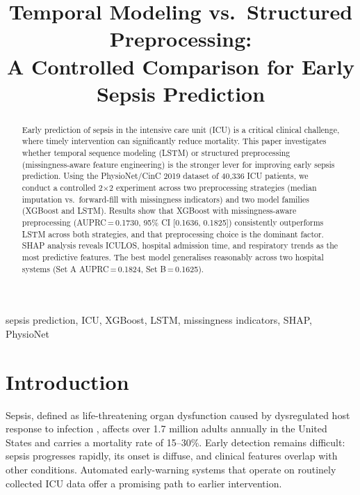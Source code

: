 \documentclass[conference]{IEEEtran}
\begin{document}
\title{Temporal Modeling vs.\ Structured Preprocessing:\\
A Controlled Comparison for Early Sepsis Prediction}

\author{
}

\maketitle

\begin{abstract}
Early prediction of sepsis in the intensive care unit (ICU) is a critical clinical
challenge, where timely intervention can significantly reduce mortality. This paper
investigates whether temporal sequence modeling (LSTM) or structured preprocessing
(missingness-aware feature engineering) is the stronger lever for improving early
sepsis prediction. Using the PhysioNet/CinC 2019 dataset of 40,336 ICU patients,
we conduct a controlled 2$\times$2 experiment across two preprocessing strategies
(median imputation vs.\ forward-fill with missingness indicators) and two model
families (XGBoost and LSTM). Results show that XGBoost with missingness-aware
preprocessing (AUPRC\,=\,0.1730, 95\% CI [0.1636, 0.1825]) consistently outperforms
LSTM across both strategies, and that preprocessing choice is the dominant factor.
SHAP analysis reveals ICULOS, hospital admission time, and respiratory trends as
the most predictive features. The best model generalises reasonably across two
hospital systems (Set A AUPRC\,=\,0.1824, Set B\,=\,0.1625).
\end{abstract}

\begin{IEEEkeywords}
sepsis prediction, ICU, XGBoost, LSTM, missingness indicators, SHAP, PhysioNet
\end{IEEEkeywords}

\section{Introduction}

Sepsis, defined as life-threatening organ dysfunction caused by dysregulated host
response to infection \cite{singer2016third}, affects over 1.7 million adults
annually in the United States and carries a mortality rate of 15--30\%. Early
detection remains difficult: sepsis progresses rapidly, its onset is diffuse, and
clinical features overlap with other conditions. Automated early-warning systems
that operate on routinely collected ICU data offer a promising path to earlier
intervention.
\end{document}
